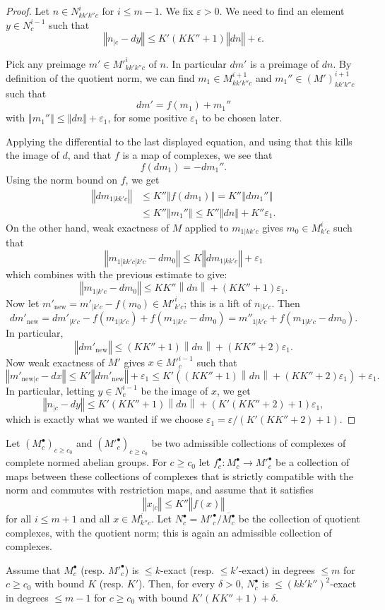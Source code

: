 \begin{proof}
\leanok
\def\ndn{\left\|dn\right\|}
Let $n \in N^i_{kk'k''c}$ for $i\leq m-1$.
We fix $ε > 0$. We need to find an element $y \in N^{i-1}_c$ such that
\[
  ‖n_{|c} - dy‖ \leq K'(KK'' + 1)‖dn‖ + \epsilon.
\]

Pick any preimage $m' \in M'^i_{kk'k''c}$ of $n$. In particular $dm'$ is
a preimage of $dn$.
By definition of the quotient norm,
we can find $m_1 ∈ M^{i+1}_{kk'k''c}$ and $m_1'' ∈ (M')^{i+1}_{kk'k''c}$ such that
\[
dm' = f(m_1) + m_1''
\]
with $‖m_1''‖ \leq ‖dn‖ + ε_1$, for some positive $ε_1$ to be chosen later.

Applying the differential to the last displayed equation, and using that this
kills the image of $d$, and that $f$ is a map of complexes, we see that
\[
f(dm_1) = -dm_1''.
\]
Using the norm bound on $f$, we get
\[\begin{aligned}
  ‖dm_{1|kk'c}‖ &≤ K''‖f(dm_1)‖ = K''‖dm_1''‖\\
                &≤ K''‖m_1''‖ ≤ K''‖dn‖ + K''ε_1.
\end{aligned}\]
On the other hand, weak exactness of $M$ applied to $m_{1|kk'c}$
gives $m_0 ∈ M^i_{k'c}$ such that
\[
  ‖m_{1|kk'c|k'c} - dm_0‖ \leq K‖dm_{1|kk'c}‖ + ε_1
\]
which combines with the previous estimate to give:
\[
  ‖m_{1|k'c} - dm_0‖ \leq K K'' \left\|d n\right\| + (KK'' + 1)ε_1.
\]
Now let $m'_{\mathrm{new}} = m'_{|k'c} - f(m_0) \in M'^i_{k'c}$; this is a lift of $n_{|k'c}$.
Then
\[
dm'_{\mathrm{new}} = dm'_{|k'c} - f(m_{1|k'c}) + f(m_{1|k'c} - dm_0) = m''_{1|k'c} + f(m_{1|k'c} - dm_0).
\]
In particular,
\[
‖dm'_{\mathrm{new}}‖ ≤ (KK'' + 1)\ndn + (KK'' + 2) ε_1.
\]
Now weak exactness of $M'$ gives $x \in M'^{i-1}_c$ such that
\[
  ‖m'_{\mathrm{new}|c} - dx‖ ≤ K'‖dm'_{\mathrm{new}}‖ + ε_1 \leq
    K'((K K'' + 1) \ndn + (KK'' + 2) ε_1) + ε_1.
\]
In particular, letting $y \in N^{i-1}_c$ be the image of $x$, we get
\[
  ‖n_{|c} - dy‖ ≤ K'(K K'' + 1)\ndn + (K'(K  K'' + 2) + 1) ε_1,
\]
which is exactly what we wanted if we choose
$ε_1 = ε/(K'(K  K'' + 2) + 1)$.
\end{proof}


\begin{proposition}
  \label{snakelemma}
  Let $(M^\bullet_c)_{c\geq c_0}$ and $(M'^\bullet_c)_{c\geq c_0}$ be two admissible collections
  of complexes of complete normed abelian groups.
  For $c\geq c_0$ let $f^\bullet_c: M^\bullet_c\to M'^\bullet_c$ be a collection of maps
  between these collections of complexes
  that is strictly compatible with the norm and commutes with restriction maps,
  and assume that it satisfies
  \[
    ‖x_{|c}‖ ≤ K''‖f(x)‖
  \]
  for all $i ≤ m+1$ and all $x\in M^i_{k''c}$.
  Let $N^\bullet_c=M'^\bullet_c/\overline{M^\bullet_c}$
  be the collection of quotient complexes, with the quotient norm;
  this is again an admissible collection of complexes.

  Assume that $M^\bullet_c$ (resp. $M'^\bullet_c$) is $\leq k$-exact
  (resp. $≤ k'$-exact) in degrees $\leq m$ for $c\geq c_0$ with bound $K$
  (resp. $K'$).
  Then, for every $δ > 0$, $N^\bullet_c$ is $\leq (kk'k'')^2$-exact in
  degrees $\leq m-1$ for $c\geq c_0$
  with bound $K'(KK'' + 1) + δ$.
\end{proposition}

